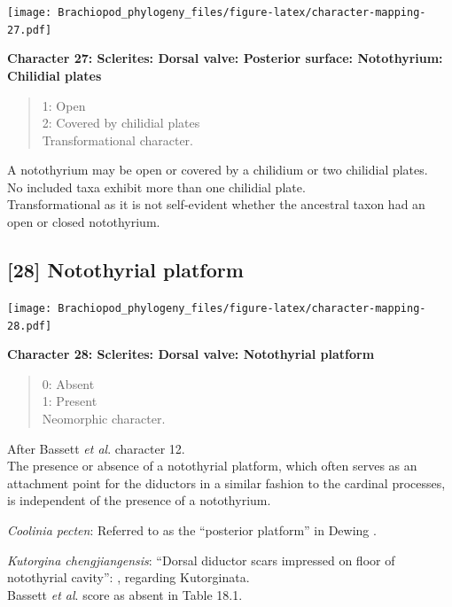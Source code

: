 \documentclass[]{book}
\theoremstyle{definition}
\theoremstyle{definition}
\theoremstyle{definition}
\theoremstyle{remark}
\begin{document}
\texttt{[image: Brachiopod\_phylogeny\_files/figure-latex/character-mapping-27.pdf]}

\textbf{Character 27: Sclerites: Dorsal valve: Posterior surface:
Notothyrium: Chilidial plates}

\begin{quote}
1: Open\\
2: Covered by chilidial plates\\
Transformational character.
\end{quote}

A notothyrium may be open or covered by a chilidium or two chilidial
plates.\\
No included taxa exhibit more than one chilidial plate.\\
Transformational as it is not self-evident whether the ancestral taxon
had an open or closed notothyrium.

\hypertarget{notothyrial-platform}{%
\subsection*{{[}28{]} Notothyrial platform}\label{notothyrial-platform}}

\texttt{[image: Brachiopod\_phylogeny\_files/figure-latex/character-mapping-28.pdf]}

\textbf{Character 28: Sclerites: Dorsal valve: Notothyrial platform}

\begin{quote}
0: Absent\\
1: Present\\
Neomorphic character.
\end{quote}

After Bassett \emph{et al}.
\citeyearpar{Bassett2001Functionalmorphology} character 12.\\
The presence or absence of a notothyrial platform, which often serves as
an attachment point for the diductors in a similar fashion to the
cardinal processes, is independent of the presence of a notothyrium.

\emph{Coolinia pecten}: Referred to as the ``posterior platform'' in
Dewing \citeyearpar{Dewing2001Hingemodifications}.

\emph{Kutorgina chengjiangensis}: ``Dorsal diductor scars impressed on
floor of notothyrial cavity'':
\citet{Williams2000BrachiopodaLinguliformea}, regarding Kutorginata.\\
Bassett \emph{et al}. \citeyearpar{Bassett2001Functionalmorphology}
score as absent in Table 18.1.
\end{document}
